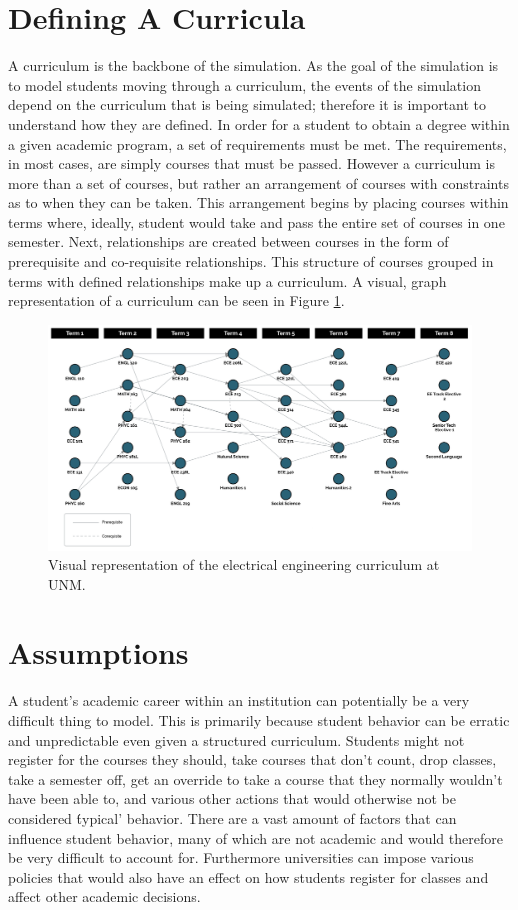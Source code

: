 \documentclass[botnum, fleqn]{unmeethesis}
\begin{document}
  \section{Defining A Curricula}
  A curriculum is the backbone of the simulation. As the goal of the simulation is to model students moving through a curriculum, the events of the simulation depend on the curriculum that is being simulated; therefore it is important to understand how they are defined. In order for a student to obtain a degree within a given academic program, a set of requirements must be met. The requirements, in most cases, are simply courses that must be passed. However a curriculum is more than a set of courses, but rather an arrangement of courses with constraints as to when they can be taken. This arrangement begins by placing courses within terms where, ideally, student would take and pass the entire set of courses in one semester. Next, relationships are created between courses in the form of prerequisite and co-requisite relationships. This structure of courses grouped in terms with defined relationships make up a curriculum. A visual, graph representation of a curriculum can be seen in Figure \ref{fig:curriculum_example}.

  \begin{figure}[h!]
  \centerline{\includegraphics[scale=0.4]{./figures/curriculum_example.jpg}}
  \caption{Visual representation of the electrical engineering curriculum at UNM.} 
  \label{fig:curriculum_example}
  \end{figure}


  \section{Assumptions}
  A student's academic career within an institution can potentially be a very difficult thing to model. This is primarily because student behavior can be erratic and unpredictable even given a structured curriculum. Students might not register for the courses they should, take courses that don't count, drop classes, take a semester off, get an override to take a course that they normally wouldn't have been able to, and various other actions that would otherwise not be considered \'typical' behavior. There are a vast amount of factors that can influence student behavior, many of which are not academic and would therefore be very difficult to account for. Furthermore universities can impose various policies that would also have an effect on how students register for classes and affect other academic decisions. 
\end{document}
